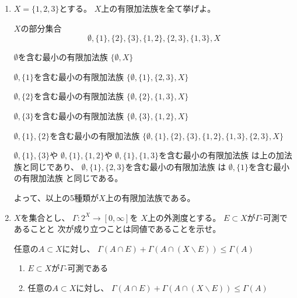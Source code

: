 \documentclass[12pt,b5paper]{ltjsarticle}
\begin{document}
\hrulefill

\begin{enumerate}
 \item
      $X=\{ 1,2,3\}$とする。
      $X$上の有限加法族を全て挙げよ。

      \dotfill

      $X$の部分集合
      \begin{equation}
       \emptyset,\{1\},\{2\},\{3\},
        \{1,2\},\{2,3\},\{1,3\},X
      \end{equation}

      $\emptyset$を含む最小の有限加法族
      \quad $\{ \emptyset,X\}$

      $\emptyset,\{1\}$を含む最小の有限加法族
      \quad $\{ \emptyset,\{1\},\{2,3\},X\}$

      $\emptyset,\{2\}$を含む最小の有限加法族
      \quad $\{ \emptyset,\{2\},\{1,3\},X\}$

      $\emptyset,\{3\}$を含む最小の有限加法族
      \quad $\{ \emptyset,\{3\},\{1,2\},X\}$

      $\emptyset,\{1\},\{2\}$を含む最小の有限加法族
      \quad $\{ \emptyset,\{1\},\{2\},\{3\},\{1,2\},\{1,3\},\{2,3\},X\}$

      $\emptyset,\{1\},\{3\}$や
      $\emptyset,\{1\},\{1,2\}$や
      $\emptyset,\{1\},\{1,3\}$を含む最小の有限加法族
      は上の加法族と同じであり、
      $\emptyset,\{1\},\{2,3\}$を含む最小の有限加法族
      は
      $\emptyset,\{1\}$を含む最小の有限加法族
      と同じである。

      よって、以上の5種類が$X$上の有限加法族である。

      \hrulefill

 \item
      $X$を集合とし、
      $\Gamma : 2^{X}\to[0,\infty]$を
      $X$上の外測度とする。
      $E\subset X$が$\Gamma$-可測であることと
      次が成り立つことは同値であることを示せ。
      \begin{center}
       任意の$A\subset X$に対し、
       $\Gamma(A\cap E) + \Gamma(A\cap (X\backslash E)) \leq \Gamma(A)$
      \end{center}

      \dotfill

      \begin{enumerate}
       \item \label{enu:kasoku}
             $E\subset X$が$\Gamma$-可測である
       \item \label{enu:prop}
             任意の$A\subset X$に対し、
             $\Gamma(A\cap E) + \Gamma(A\cap (X\backslash E)) \leq \Gamma(A)$
      \end{enumerate}


\end{enumerate}
\end{document}
